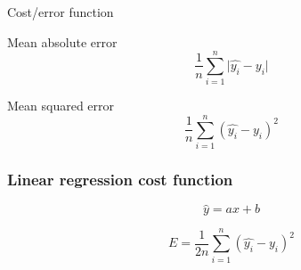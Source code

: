 \begin{frame}{Cost/error function}
  \begin{minipage}[l]{0.40\linewidth}
  Mean absolute error
    \[
      \frac{1}{n}\sum_{i=1}^n \lvert \hat{y_i} - y_i \rvert
    \]

  Mean squared error
    \[
      \frac{1}{n}\sum_{i=1}^n( \hat{y_i} - y_i )^2
    \]
  \end{minipage}\hfill
  \begin{minipage}[l]{0.59\linewidth}
  \end{minipage}\hfill
\end{frame}

\begin{frame}
  \frametitle{Linear regression cost function}
  \begin{minipage}[l]{0.49\linewidth}
    \[
      \hat{y} = ax + b
    \]
  \end{minipage}\hfill
  \begin{minipage}[l]{0.49\linewidth}
    \[
      \boxed{E = \frac{1}{2n}\sum_{i=1}^n( \hat{y_i} - y_i )^2}
    \]
  \end{minipage}\hfill
\end{frame}
